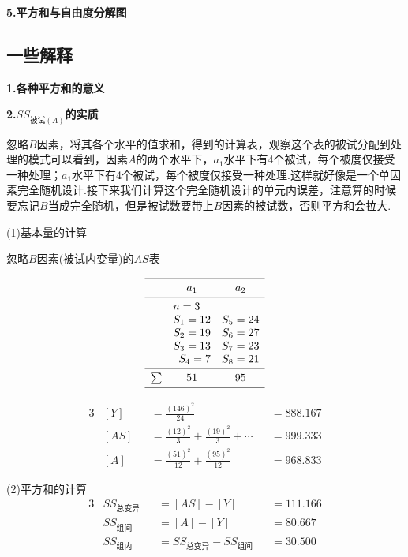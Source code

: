 \textbf{5.平方和与自由度分解图}

\subsection{一些解释}
\textbf{1.各种平方和的意义}


\textbf{2.$SS_{\text{被试}\left( A \right)}$的实质}

忽略$B$因素，将其各个水平的值求和，得到的计算表，观察这个表的被试分配到处理的模式可以看到，因素$A$的两个水平下，$a_1$水平下有4个被试，每个被度仅接受一种处理；$a_1$水平下有4个被试，每个被度仅接受一种处理.这样就好像是一个单因素完全随机设计.接下来我们计算这个完全随机设计的单元内误差，注意算的时候要忘记$B$当成完全随机，但是被试数要带上$B$因素的被试数，否则平方和会拉大.

(1)基本量的计算

\begin{margintable}
  \centering
  \caption{忽略$B$因素(被试内变量)的$AS$表}
    \[\begin{array}{crr}
        \toprule
              & \multicolumn{1}{c}{a_1}   & \multicolumn{1}{c}{a_2} \\
        \midrule
              & \multicolumn{1}{l}{n=3} &  \\
              & S_1=12 & S_5=24 \\
              & S_2=19 & S_6=27 \\
              & S_3=13 & S_7=23 \\
              & S_4=7 & S_8=21 \\
        \midrule
            \sum  & \multicolumn{1}{c}{51}    & \multicolumn{1}{c}{95} \\
        \bottomrule
    \end{array}\]
\end{margintable}

\begin{alignat*}{3}
    &\left[ Y \right]  &&=  \frac{\left( 146 \right) ^2}{24}                                         &&=888.167\\
    &\left[ AS \right] &&=  \frac{\left( 12 \right) ^2}{3}+\frac{\left( 19 \right) ^2}{3}+\cdots     &&=999.333\\
    &\left[ A \right]  && = \frac{\left( 51 \right) ^2}{12}+\frac{\left( 95 \right) ^2}{12}          &&=968.833
\end{alignat*}

(2)平方和的计算
\begin{alignat*}{3}
    & SS_{\text{总变异}} &&=     [AS] - [Y]                             &&= 111.166\\
    & SS_{\text{组间}}   &&=     [A] - [Y]                              &&= 80.667\\
    & SS_{\text{组内}}   &&=     SS_{\text{总变异}} - SS_{\text{组间}}  &&= 30.500
\end{alignat*}

